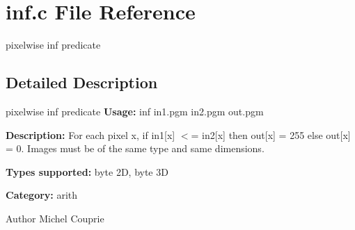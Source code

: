 \section{inf.c File Reference}
\label{inf_8c}


pixelwise inf predicate  




\subsection{Detailed Description}
pixelwise inf predicate {\bfseries Usage:} inf in1.pgm in2.pgm out.pgm

{\bfseries Description:} For each pixel x, if in1[x] $<$= in2[x] then out[x] = 255 else out[x] = 0. Images must be of the same type and same dimensions.

{\bfseries Types supported:} byte 2D, byte 3D

{\bfseries Category:} arith

\begin{DoxyAuthor}{Author}
Michel Couprie 
\end{DoxyAuthor}
